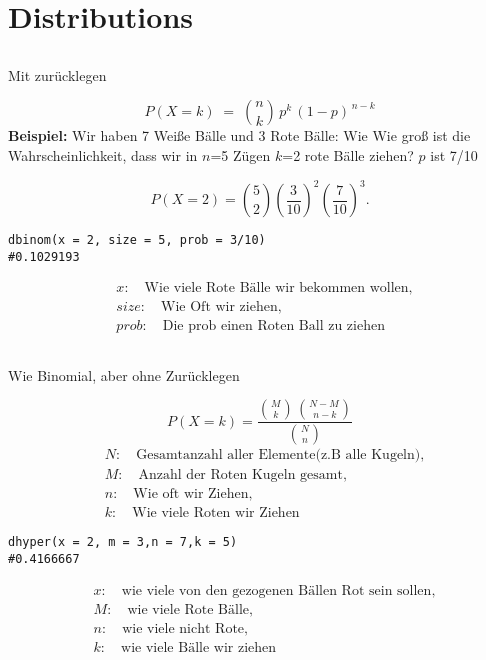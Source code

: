\section{Distributions}

\subsection*{\centering{}}
\begin{center}
\textcolor{red}{\warning}\textcolor{red}{\warning} Mit zurücklegen \textcolor{red}{\warning}\textcolor{red}{\warning}
\end{center}
\[ 
P(X = k) \;=\; \binom{n}{k}\,p^k\,(1-p)^{\,n-k} 
\]
\large{\textbf{Beispiel:}}
\normalsize
Wir haben 7 Weiße Bälle und 3 Rote Bälle:
Wie Wie groß ist die Wahrscheinlichkeit, dass wir in $n$=5 Zügen $k$=2 rote Bälle ziehen? $p$ ist 7/10

\[
P(X = 2) = \binom{5}{2} \left(\frac{3}{10}\right)^2 \left(\frac{7}{10}\right)^3.
\]
\normalsize
\begin{lstlisting}
dbinom(x = 2, size = 5, prob = 3/10)
#0.1029193
\end{lstlisting}
\[
    \begin{aligned}
    &x:\quad \text{Wie viele Rote Bälle wir bekommen wollen},\\
    &size:\quad \text{Wie Oft wir ziehen},\\
    &prob:\quad \text{Die prob einen Roten Ball zu ziehen}
    \end{aligned}
\]
\subsection*{\centering{}}
\begin{center}
\textcolor{red}{\warning}\textcolor{red}{\warning} Wie Binomial, aber ohne Zurücklegen \textcolor{red}{\warning}\textcolor{red}{\warning}
\end{center}
\[
P(X = k) 
= \frac{\binom{M}{k}\,\binom{N - M}{\,n - k}}{\binom{N}{n}}
\]
\normalsize
\[
\begin{aligned}
&N:\quad \text{Gesamtanzahl aller Elemente(z.B alle Kugeln)},\\
&M:\quad \text{Anzahl der Roten Kugeln gesamt},\\
&n:\quad \text{Wie oft wir Ziehen},\\
&k:\quad \text{Wie viele Roten wir Ziehen}
\end{aligned}
\]
\begin{lstlisting}
dhyper(x = 2, m = 3,n = 7,k = 5)
#0.4166667
\end{lstlisting}
\normalsize
\[
\begin{aligned}
&x:\quad \text{wie viele von den gezogenen Bällen Rot sein sollen},\\
&M:\quad \text{wie viele Rote Bälle},\\
&n:\quad \text{wie viele nicht Rote},\\
&k:\quad \text{wie viele Bälle wir ziehen}
\end{aligned}
\]

